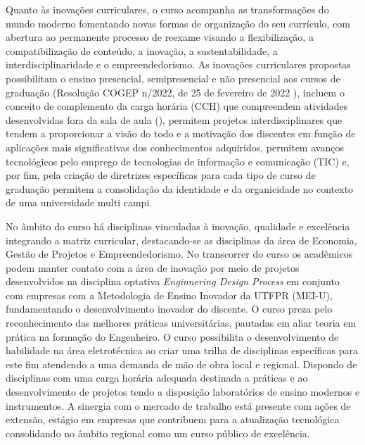 Quanto às inovações curriculares, o curso acompanha as transformações do mundo moderno fomentando novas formas de organização do seu currículo, com abertura ao permanente processo de reexame visando a flexibilização, a compatibilização de conteúdo, a inovação, a sustentabilidade, a interdisciplinaridade e o empreendedorismo.  As inovações curriculares propostas possibilitam o ensino presencial, semipresencial e não presencial aos cursos de graduação (Resolução COGEP n/2022, de 25 de fevereiro de 2022 \cite{cogep142}), incluem o conceito de complemento da carga horária (CCH) que compreendem atividades desenvolvidas fora da sala de aula (), permitem projetos interdisciplinares que tendem a proporcionar a visão do todo e a motivação dos discentes em função de aplicações mais significativas dos conhecimentos adquiridos, permitem avanços tecnológicos pelo emprego de tecnologias de informação e comunicação (TIC) e, por fim, pela criação de diretrizes específicas para cada tipo de curso de graduação permitem a consolidação da identidade e da organicidade no contexto de uma universidade multi campi.


No âmbito do curso há disciplinas vinculadas à inovação, qualidade e excelência integrando a matriz curricular, destacando-se as disciplinas da área de Economia, Gestão de Projetos e Empreendedorismo. No transcorrer do curso os acadêmicos podem manter contato com a área de inovação por meio de projetos desenvolvidos na disciplina optativa \textit{Enginnering Design Process} em conjunto com empresas com a Metodologia de Ensino Inovador da UTFPR (MEI-U), fundamentando o desenvolvimento inovador do discente. O curso preza pelo reconhecimento das melhores práticas universitárias, pautadas em aliar teoria em prática na formação do Engenheiro.  O curso possibilita o desenvolvimento de habilidade na área eletrotécnica ao criar uma trilha de disciplinas específicas para este fim atendendo a uma demanda de mão de obra local e regional. Dispondo de disciplinas com uma carga horária adequada destinada a práticas e ao desenvolvimento de projetos tendo a disposição laboratórios de ensino modernos e instrumentos. A sinergia com o mercado de trabalho está presente com ações de extensão, estágio em empresas que contribuem para a atualização tecnológica consolidando no âmbito regional como um curso público de excelência.

